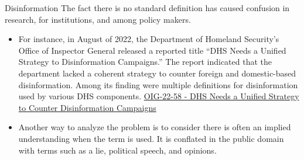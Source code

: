 \documentclass[nobackground,dvipsnames,table]{beamer}
\begin{document}
\begin{frame}{Disinformation}
The fact there is no standard definition has caused confusion in research, for institutions, and among policy makers.

\begin{itemize}
    \item For instance, in August of 2022, the Department of Homeland Security’s Office of Inspector General released a reported title “DHS Needs a Unified Strategy to Disinformation Campaigns.”  The report indicated that the department lacked a coherent strategy to counter foreign and domestic-based disinformation.  Among its finding were multiple definitions for disinformation used by various DHS components. \href{https://www.oig.dhs.gov/sites/default/files/assets/2022-08/OIG-22-58-Aug22.pdf}{OIG-22-58 - DHS Needs a Unified Strategy to Counter Disinformation Campaigns}
    \item Another way to analyze the problem is to consider there is often an implied understanding when the term is used.  It is conflated in the public domain with terms such as a lie, political speech, and opinions.
\end{itemize}

\end{frame}
\end{document}
